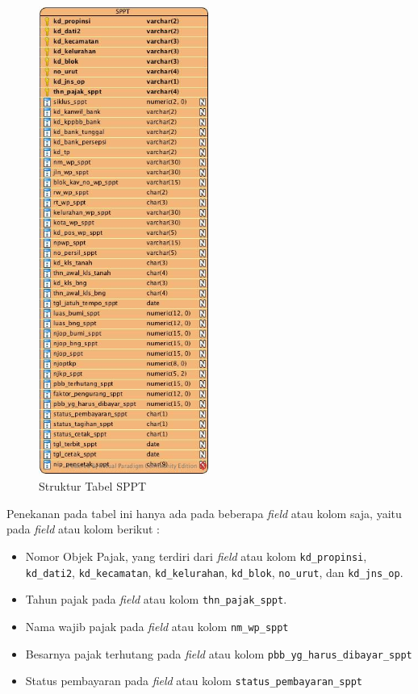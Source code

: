 \begin{figure}[H]
	\centering
	\includegraphics[width=0.5\textwidth]{./resources/struktur-tabel-sppt}
	\caption{Struktur Tabel SPPT}
	\label{fig:struktur-tabel-sppt}
\end{figure}

Penekanan pada tabel ini hanya ada pada beberapa \textit{field} atau kolom saja, yaitu pada \textit{field} atau kolom berikut :

\begin{itemize}
	\item Nomor Objek Pajak, yang terdiri dari \textit{field} atau kolom \texttt{kd\_propinsi}, \texttt{kd\_dati2}, \texttt{kd\_kecamatan}, \texttt{kd\_kelurahan}, \texttt{kd\_blok}, \texttt{no\_urut}, dan \texttt{kd\_jns\_op}.
	\item Tahun pajak pada \textit{field} atau kolom \texttt{thn\_pajak\_sppt}.
	\item Nama wajib pajak pada \textit{field} atau kolom \texttt{nm\_wp\_sppt}
	\item Besarnya pajak terhutang pada \textit{field} atau kolom \texttt{pbb\_yg\_harus\_dibayar\_sppt}
	\item Status pembayaran pada \textit{field} atau kolom \texttt{status\_pembayaran\_sppt}
\end{itemize}

